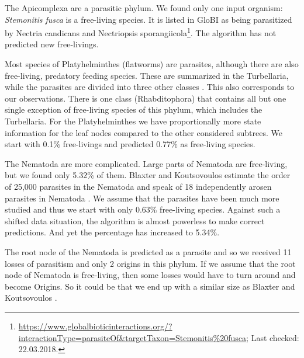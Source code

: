     The Apicomplexa are a parasitic phylum. We found only one input organism: \textit{Stemonitis fusca} 
      is a free-living species. It is listed in GloBI as being parasitized by Nectria candicans and 
      Nectriopsis sporangiicola\footnote{
        \hyperlink{https://www.globalbioticinteractions.org/?interactionType=parasiteOf&targetTaxon=Stemonitis\%20fusca}
        {https://www.globalbioticinteractions.org/?interactionType=parasiteOf\&targetTaxon=Stemonitis\%20fusca};
        Last checked: 22.03.2018.
      }. The algorithm has not predicted new free-livings.

    Most species of Platyhelminthes (flatworms) are parasites, although there are also free-living, 
      predatory feeding species. These are summarized in the Turbellaria, while the parasites are 
      divided into three other classes \cite{Ax1961}. This also corresponds to our observations. There 
      is one class (Rhabditophora) that contains all but one single exception of free-living species 
      of this phylum, which includes the Turbellaria. For the Platyhelminthes we have proportionally 
      more state information for the leaf nodes compared to the other considered subtrees. We start 
      with 0.1\% free-livings and predicted 0.77\% as free-living species.

    The Nematoda are more complicated. Large parts of Nematoda are free-living, but we found only 
      5.32\% of them. Blaxter and Koutsovoulos estimate the order of 25,000 parasites in the Nematoda 
      and speak of 18 independently arosen parasites in Nematoda \cite{Blaxter2015}. We assume that 
      the parasites have been much more studied and thus we start with only 0.63\% free-living species. 
      Against such a shifted data situation, the algorithm is almost powerless to make correct 
      predictions. And yet the percentage has increased to 5.34\%.

    The root node of the Nematoda is predicted as a parasite and so we received 11 losses of parasitism 
      and only 2 origins in this phylum. If we assume that the root node of Nematoda is free-living, 
      then some losses would have to turn around and become Origins. So it could be that we end up 
      with a similar size as Blaxter and Koutsovoulos \cite{Blaxter2015}.

